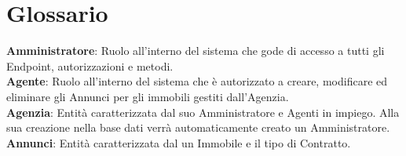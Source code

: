 \newpage
\section{Glossario}

\textbf{Amministratore}: Ruolo all'interno del sistema che gode di accesso a tutti gli Endpoint, autorizzazioni  e metodi.\\
\textbf{Agente}: Ruolo all'interno del sistema che è autorizzato a creare, modificare ed eliminare gli Annunci per gli immobili gestiti dall'Agenzia.\\
\textbf{Agenzia}: Entità caratterizzata dal suo Amministratore e Agenti in  impiego. Alla sua creazione nella base dati verrà automaticamente creato un Amministratore.\\
\textbf{Annunci}: Entità caratterizzata dal un Immobile e il tipo di Contratto.\\

\newpage
